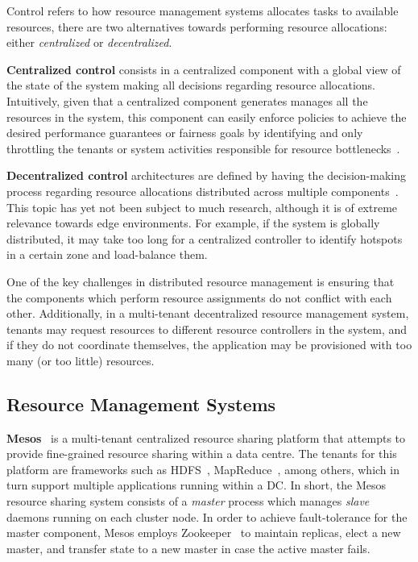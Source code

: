 Control refers to how resource management systems allocates tasks to available resources, there are two alternatives towards performing resource allocations: either \textit{centralized} or \textit{decentralized}.

\textbf{Centralized control} consists in a centralized component with a global view of the state of the system making all decisions regarding resource allocations. Intuitively, given that a centralized component generates manages all the resources in the system, this component can easily enforce policies to achieve the desired performance guarantees or fairness goals by identifying and only throttling the tenants or system activities responsible for resource bottlenecks~\cite{verma2015large}.

\textbf{Decentralized control} architectures are defined by having the decision-making process regarding resource allocations distributed across multiple components~\cite{Hong2019}. This topic has yet not been subject to much research, although it is of extreme relevance towards edge environments. For example, if the system is globally distributed, it may take too long for a centralized controller to identify hotspots in a certain zone and load-balance them.

One of the key challenges in distributed resource management is ensuring that the components which perform resource assignments do not conflict with each other. Additionally, in a multi-tenant decentralized resource management system, tenants may request resources to different resource controllers in the system, and if they do not coordinate themselves, the application may be provisioned with too many (or too little) resources.

\subsection{Resource Management Systems}

\textbf{Mesos}~\cite{hindman2011mesos} is a multi-tenant centralized resource sharing platform that attempts to provide fine-grained resource sharing within a data centre. The tenants for this platform are frameworks such as HDFS~\cite{borthakur2008hdfs}, MapReduce~\cite{dean2008mapreduce}, among others, which in turn support multiple applications running within a DC. In short, the Mesos resource sharing system consists of a \textit{master} process which manages \textit{slave} daemons running on each cluster node. In order to achieve fault-tolerance for the master component, Mesos employs Zookeeper~\cite{hunt2010zookeeper} to maintain replicas, elect a new master, and transfer state to a new master in case the active master fails.

